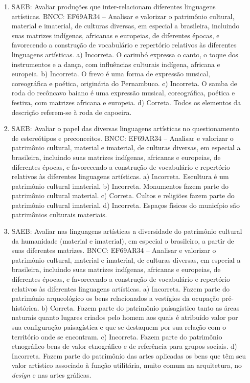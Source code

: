\begin{enumerate}
\item
SAEB: Avaliar produções que inter-relacionam diferentes linguagens
artísticas.
BNCC: EF69AR34 -- Analisar e valorizar o patrimônio cultural, material e imaterial, de culturas
diversas, em especial a brasileira, incluindo suas matrizes indígenas, africanas e europeias,
de diferentes épocas, e favorecendo a construção de vocabulário e repertório relativos às
diferentes linguagens artísticas.
a) Incorreta. O carimbó expressa o canto, o toque dos instrumentos e a
  dança, com influências culturais indígena, africana e europeia.
b) Incorreta. O frevo é uma forma de expressão musical, coreográfica e
  poética, originária do Pernambuco.
c) Incorreta. O samba de roda do recôncavo baiano é uma expressão
  musical, coreográfica, poética e festiva, com matrizes africana e
  europeia.
d) Correta. Todos os elementos da descrição referem-se à roda de capoeira.

\item
SAEB: Avaliar o papel das diversas linguagens artísticas no
questionamento de estereótipos e preconceitos.
BNCC: EF69AR34 -- Analisar e valorizar o patrimônio cultural, material e imaterial, de culturas
diversas, em especial a brasileira, incluindo suas matrizes indígenas, africanas e europeias,
de diferentes épocas, e favorecendo a construção de vocabulário e repertório relativos às
diferentes linguagens artísticas.
a) Incorreta. Escultura é um patrimônio cultural imaterial.
b) Incorreta. Monumentos fazem parte do patrimônio cultural material.
c) Correta. Cultos e religiões fazem parte do patrimônio cultural imaterial.
d) Incorreta. Espaços físicos do município são patrimônios culturais materiais.

\item
SAEB: Avaliar nas linguagens artísticas a diversidade do patrimônio
cultural da humanidade (material e imaterial), em especial o brasileiro,
a partir de suas diferentes matrizes.
BNCC: EF69AR34 -- Analisar e valorizar o patrimônio cultural, material e imaterial, de culturas
diversas, em especial a brasileira, incluindo suas matrizes indígenas, africanas e europeias,
de diferentes épocas, e favorecendo a construção de vocabulário e repertório relativos às
diferentes linguagens artísticas.
a) Incorreta. Fazem parte do patrimônio arqueológico os bens relacionados
  a vestígios da ocupação pré-histórica.
b) Correta. Fazem parte do patrimônio paisagístico tanto as áreas
  naturais quanto lugares criados pelo homem aos quais é atribuído
  valor por sua configuração paisagística e que se destaquem por sua
  relação com o território onde se encontram.
c) Incorreta. Fazem parte do patrimônio etnográfico bens de valor
  etnográfico e de referência para grupos sociais.
d) Incorreta. Fazem parte do patrimônio das artes aplicadas os bens que
  têm seu valor artístico associado à função utilitária, muito comum na
  arquitetura, no \textit{design} e nas artes gráficas.
\end{enumerate}

